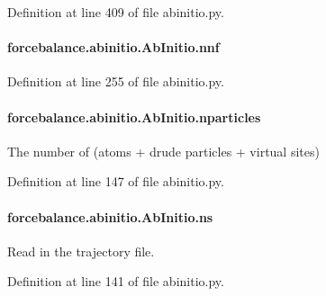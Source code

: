 Definition at line 409 of file abinitio.\-py.

\hypertarget{classforcebalance_1_1abinitio_1_1AbInitio_ac4a5765bf5b089176518f47004fcdb39}{
\paragraph[{nnf}]{\setlength{\rightskip}{0pt plus 5cm}forcebalance.\-abinitio.\-Ab\-Initio.\-nnf}}\label{classforcebalance_1_1abinitio_1_1AbInitio_ac4a5765bf5b089176518f47004fcdb39}


Definition at line 255 of file abinitio.\-py.

\hypertarget{classforcebalance_1_1abinitio_1_1AbInitio_aef3798e4666b91ecc4c526b679eb4908}{
\paragraph[{nparticles}]{\setlength{\rightskip}{0pt plus 5cm}forcebalance.\-abinitio.\-Ab\-Initio.\-nparticles}}\label{classforcebalance_1_1abinitio_1_1AbInitio_aef3798e4666b91ecc4c526b679eb4908}


The number of (atoms + drude particles + virtual sites) 



Definition at line 147 of file abinitio.\-py.

\hypertarget{classforcebalance_1_1abinitio_1_1AbInitio_a1e8248e2efe952362b1b21462a70b540}{
\paragraph[{ns}]{\setlength{\rightskip}{0pt plus 5cm}forcebalance.\-abinitio.\-Ab\-Initio.\-ns}}\label{classforcebalance_1_1abinitio_1_1AbInitio_a1e8248e2efe952362b1b21462a70b540}


Read in the trajectory file. 



Definition at line 141 of file abinitio.\-py.

